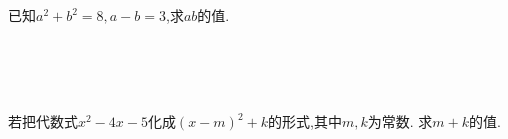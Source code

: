 \begin{comment}
    \item{
        若多项式$ 9x^2 - mx+16$是一个完全平方式,则 $m$的值是多少？
    }
    \\ \\ \\
\end{comment}

\item{
    已知$a^2+b^2=8, a-b=3$,求$ab$的值.
    \iffalse
    \fangsong\zihao{4}
    思路: 看到$a^2+b^2, a-b, ab$, 应该想到完全平方公式.
    \fi
}
\\ \\ \\

\begin{comment}
    \item{
        若$x^2+mx+9$是完全平方式,求常数$m$的值.
    }
    \\ \\ \\


    \item{
        若$x+y=2$,求代数式$x^2-y^2+4y$的值.
    }
    \\ \\ \\
\end{comment}

\item{
    若把代数式$x^2-4x-5$化成$(x-m)^2+k$的形式,其中$m,k$为常数. 求$m+k$的值.
    \iffalse
    \fangsong\zihao{4}
    思路: 把$(x-m)^2+k$转化为$ax^2+bx+c$的形式,再比较各项系数,解出$m,k$.\\
    注意: 系数的位置.

    解答: 
    \begin{align*}
        (x-m)^2+k &= x^2-2mx+m^2+k
    \end{align*}
    与$x^2-4x-5$比较,对应项的系数相等,常数项相等,得到方程
    \[\left\{ 
        \begin{array}{lc}
            2m = 4\\
            m^2+k=-5
        \end{array}
    \right.\]
    解得
    \[\left\{ 
        \begin{array}{lc}
            m = 2\\
            k =-9
        \end{array}
    \right.\]
    $\therefore m+k=-7.$
    \fi
}
\\ \\ \\

